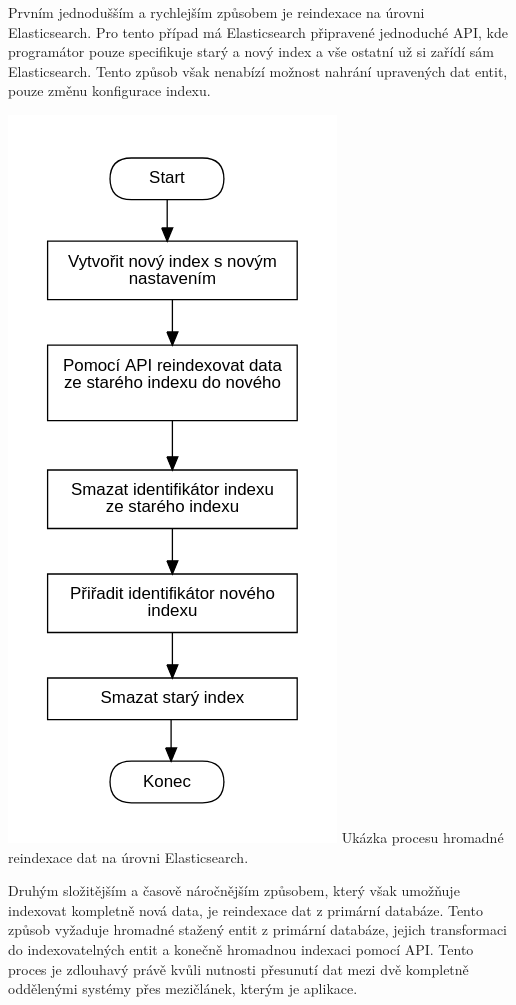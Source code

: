 \begin{itemize}
\begin{itemize}
		Prvním jednodušším a rychlejším způsobem je reindexace na úrovni Elasticsearch.
		Pro tento případ má Elasticsearch připravené jednoduché \ac{API}, kde programátor pouze specifikuje starý a nový
		index a vše ostatní už si zařídí sám Elasticsearch.
		Tento způsob však nenabízí možnost nahrání upravených dat entit, pouze změnu konfigurace indexu.

		\includegraphics{obrazky/proces_reindexace_na_urovni_es}\hfill
		Ukázka procesu hromadné reindexace dat na úrovni Elasticsearch. %

		Druhým složitějším a časově náročnějším způsobem, který však umožňuje indexovat kompletně nová data, je
		reindexace dat z primární databáze.
		Tento způsob vyžaduje hromadné stažený entit z primární databáze, jejich transformaci do indexovatelných entit
		a konečně hromadnou indexaci pomocí \ac{API}.
		Tento proces je zdlouhavý právě kvůli nutnosti přesunutí dat mezi dvě kompletně oddělenými systémy přes mezičlánek,
		kterým je aplikace.


\end{itemize}
\end{itemize}
